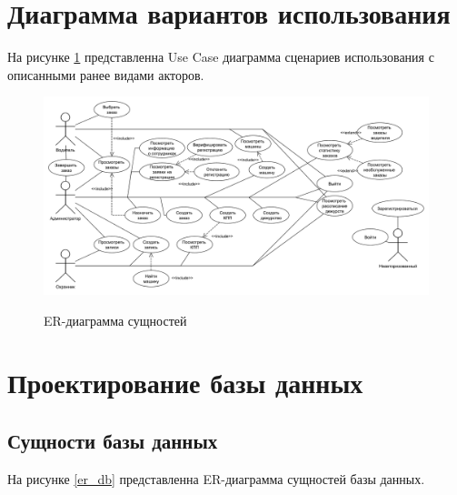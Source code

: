 \section{Диаграмма вариантов использования}
На рисунке \ref{use_case} представленна Use Case диаграмма сценариев использования с описанными ранее видами акторов.


\begin{figure}[ph!]
	\begin{center}
		{\includegraphics[scale=0.4, angle=-90]{schemes/use-case.pdf}}
		\caption{ER-диаграмма сущностей}
		\label{use_case}
	\end{center}
\end{figure}

\section{Проектирование базы данных}
\subsection{Сущности базы данных}
На рисунке \ref{er_db} представленна ER-диаграмма сущностей базы данных.

